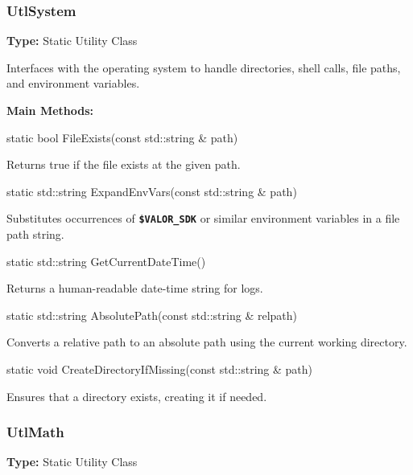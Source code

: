 \vspace{1em}
\subsubsection*{\color{cadmiumgreen}\bf UtlSystem}

\textbf{Type:} Static Utility Class

Interfaces with the operating system to handle directories, shell calls, file paths, and environment variables.

\vspace{0.5em}
\noindent\textbf{Main Methods:}

\begin{description}[align=left]

  \item[] {\color{cadmiumred} static bool FileExists(const std::string \& path)}

  Returns {\color{amber}true} if the file exists at the given path.

  \item[] {\color{cadmiumred} static std::string ExpandEnvVars(const std::string \& path)}

  Substitutes occurrences of {\bf \tt \$VALOR\_SDK} or similar environment variables in a file path string.

  \item[] {\color{cadmiumred} static std::string GetCurrentDateTime()}

  Returns a human-readable date-time string for logs.

  \item[] {\color{cadmiumred} static std::string AbsolutePath(const std::string \& relpath)}

  Converts a relative path to an absolute path using the current working directory.

  \item[] {\color{cadmiumred} static void CreateDirectoryIfMissing(const std::string \& path)}

  Ensures that a directory exists, creating it if needed.

\end{description}

\vspace{1em}
\subsubsection*{\color{cadmiumgreen}\bf UtlMath}

\textbf{Type:} Static Utility Class

